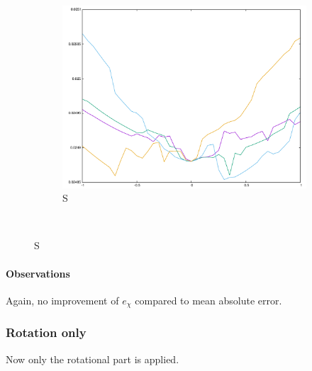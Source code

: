 {\begin{figure}[H]
\begin{subfigure}{.33\textwidth}
	\includegraphics[width=\linewidth]{fig/ajherr/t3t/S_mae.pdf}
	\caption{S}
\end{subfigure}\\
\end{figure}

\paragraph{Observations} Again, no improvement of $e_{\chi}$ compared to mean absolute error.



\subsubsection{Rotation only}
Now only the rotational part is applied.


}
